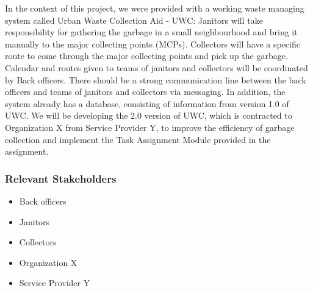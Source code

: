 \documentclass[a4paper, 13pt]{article}
\begin{document}
In the context of this project, we were provided with a working waste managing system called Urban Waste Collection Aid - UWC: Janitors will take responsibility for gathering the garbage in a small neighbourhood and bring it manually to the major collecting points (MCPs). Collectors will have a specific route to come through the major collecting points and pick up the garbage. Calendar and routes given to teams of janitors and collectors will be coordinated by Back officers. There should be a strong communication line between the back officers and teams of janitors and collectors via messaging. In addition, the system already has a database, consisting of information from version 1.0 of UWC. We will be developing the 2.0 version of UWC, which is contracted to Organization X from Service Provider Y, to improve the efficiency of garbage collection and implement the Task Assignment Module provided in the assignment.
\newpage

\subsubsection{Relevant Stakeholders}
\begin{itemize}
    \item Back officers
    \item Janitors
    \item Collectors
    \item Organization X
    \item Service Provider Y
\end{itemize}
\end{document}

